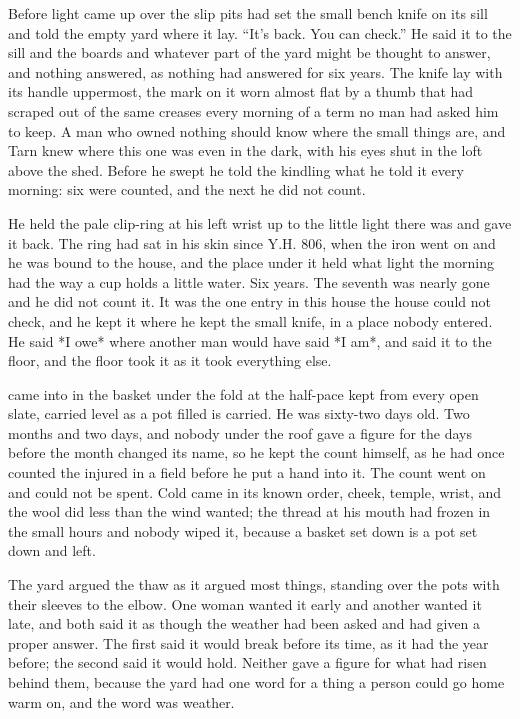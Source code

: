 
Before light came up over the slip pits  had set the small bench knife on its sill and told the empty yard where it lay. “It's back. You can check.” He said it to the sill and the boards and whatever part of the yard might be thought to answer, and nothing answered, as nothing had answered for six years. The knife lay with its handle uppermost, the mark on it worn almost flat by a thumb that had scraped  out of the same creases every morning of a term no man had asked him to keep. A man who owned nothing should know where the small things are, and Tarn knew where this one was even in the dark, with his eyes shut in the loft above the shed. Before he swept he told the kindling what he told it every morning: six were counted, and the next he did not count.

He held the pale clip-ring at his left wrist up to the little light there was and gave it back. The ring had sat in his skin since Y.H. 806, when the iron went on and he was bound to the house, and the place under it held what light the morning had the way a cup holds a little water. Six years. The seventh was nearly gone and he did not count it. It was the one entry in this house the house could not check, and he kept it where he kept the small knife, in a place nobody entered. He said *I owe* where another man would have said *I am*, and said it to the floor, and the floor took it as it took everything else.

 came into  in the basket under the fold at the half-pace  kept from every open slate, carried level as a pot filled is carried. He was sixty-two days old. Two months and two days, and nobody under the roof gave a figure for the days before the month changed its name, so he kept the count himself, as he had once counted the injured in a field before he put a hand into it. The count went on and could not be spent. Cold came in its known order, cheek, temple, wrist, and the wool did less than the wind wanted; the thread at his mouth had frozen in the small hours and nobody wiped it, because a basket set down is a pot set down and left.

The yard argued the thaw as it argued most things, standing over the pots with their sleeves to the elbow. One woman wanted it early and another wanted it late, and both said it as though the weather had been asked and had given a proper answer. The first said it would break before its time, as it had the year before; the second said it would hold. Neither gave a figure for what had risen behind them, because the yard had one word for a thing a person could go home warm on, and the word was weather.

